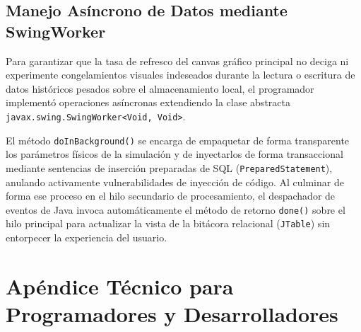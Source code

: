 \documentclass[11pt,a4paper]{article}
\begin{document}
	\subsection{Manejo Asíncrono de Datos mediante SwingWorker}
	Para garantizar que la tasa de refresco del canvas gráfico principal no deciga ni experimente congelamientos visuales indeseados durante la lectura o escritura de datos históricos pesados sobre el almacenamiento local, el programador implementó operaciones asíncronas extendiendo la clase abstracta \texttt{javax.swing.SwingWorker<Void, Void>}. 
	
	El método \texttt{doInBackground()} se encarga de empaquetar de forma transparente los parámetros físicos de la simulación y de inyectarlos de forma transaccional mediante sentencias de inserción preparadas de SQL (\texttt{PreparedStatement}), anulando activamente vulnerabilidades de inyección de código. Al culminar de forma ese proceso en el hilo secundario de procesamiento, el despachador de eventos de Java invoca automáticamente el método de retorno \texttt{done()} sobre el hilo principal para actualizar la vista de la bitácora relacional (\texttt{JTable}) sin entorpecer la experiencia del usuario.
	
	\section{Apéndice Técnico para Programadores y Desarrolladores}
	
\end{document}
